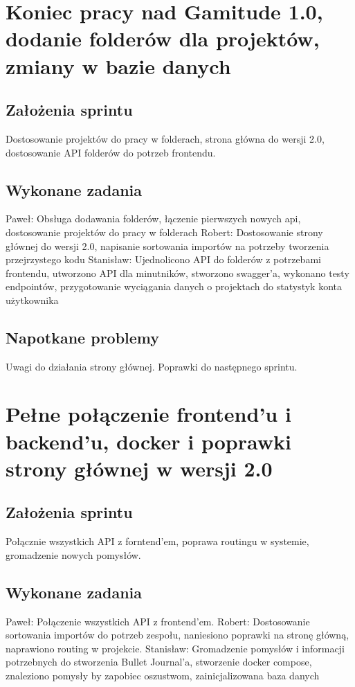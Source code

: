 \documentclass[a4paper,11pt]{report}
\begin{document}
\section {Koniec pracy nad Gamitude 1.0, dodanie folderów dla projektów, zmiany w bazie danych}
\subsection {Założenia sprintu}
Dostosowanie projektów do pracy w folderach, strona główna do wersji 2.0, dostosowanie API folderów do potrzeb frontendu.
\subsection {Wykonane zadania}
Paweł: Obsługa dodawania folderów, łączenie pierwszych nowych api, dostosowanie projektów do pracy w folderach 
Robert: Dostosowanie strony głównej do wersji 2.0, napisanie sortowania importów na potrzeby tworzenia przejrzystego kodu
Stanisław: Ujednolicono API do folderów z potrzebami frontendu, utworzono API dla minutników, stworzono swagger'a, wykonano testy endpointów, przygotowanie wyciągania danych o projektach do statystyk konta użytkownika  
\subsection {Napotkane problemy}
Uwagi do działania strony głównej. Poprawki do następnego sprintu.

\section {Pełne połączenie frontend'u i backend'u, docker i poprawki strony głównej w wersji 2.0}
\subsection {Założenia sprintu}
Połącznie wszystkich API z forntend'em, poprawa routingu w systemie, gromadzenie nowych pomysłów.
\subsection {Wykonane zadania}
Paweł: Połączenie wszystkich API z frontend'em.
Robert:  Dostosowanie sortowania importów do potrzeb zespołu, naniesiono poprawki na stronę główną, naprawiono routing w projekcie. 
Stanisław: Gromadzenie pomysłów i informacji potrzebnych do stworzenia Bullet Journal'a, stworzenie docker compose, znaleziono pomysły by zapobiec oszustwom, zainicjalizowana baza danych 
\end{document}
